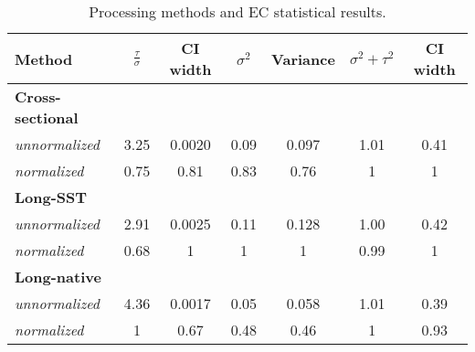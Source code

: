 
\begin{table}[h!]
\centering
\caption{Processing methods and EC statistical results.}
\begin{tabular*}{0.95\textwidth}{@{\extracolsep{\fill}} lcc|cc|cc}
\hline
Method & $\frac{\tau}{\sigma}$ & CI width& $\sigma^2$ & Variance& $\sigma^2 + \tau^2$ & CI width \\
\hline
\bf{Cross-sectional} &&&&&& \\
\quad \emph{unnormalized} & 3.25 & 0.0020  & 0.09 & 0.097 & \cellcolor{red}1.01 &0.41  \\
\quad \emph{normalized}   & 0.75 & 0.81 & 0.83 & 0.76 & \cellcolor{red} 1 & 1 \\
\bf{Long-SST} &&&&&& \\
\quad \emph{unnormalized}  & \cellcolor{red} 2.91 & \cellcolor{red} 0.0025 & \cellcolor{red} 0.11 &\cellcolor{red} 0.128 & \cellcolor{green} 1.00 & \cellcolor{red} 0.42 \\
\quad \emph{normalized}   & \cellcolor{red} 0.68 & \cellcolor{red} 1 &\cellcolor{red} 1 &\cellcolor{red} 1 & \cellcolor{green} 0.99 & \cellcolor{red} 1 \\
\bf{Long-native} &&&&&& \\
 \quad \emph{unnormalized}  & \cellcolor{green} 4.36 & \cellcolor{green} 0.0017 & \cellcolor{green} 0.05 & \cellcolor{green} 0.058 & \cellcolor{red} 1.01 & \cellcolor{green} 0.39 \\
 \quad \emph{normalized}   & \cellcolor{green} 1 & \cellcolor{green} 0.67 & \cellcolor{green} 0.48 & \cellcolor{green} 0.46 & \cellcolor{red} 1 &  \cellcolor{green} 0.93 \\
\hline
\end{tabular*}
\label{table:res_tab}
\end{table}
